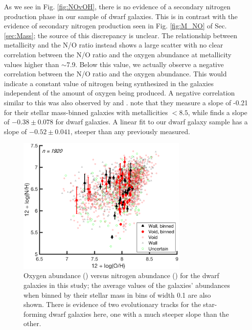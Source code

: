 As we see in Fig. \ref{fig:NOvOH}, there is no evidence of a secondary nitrogen 
production phase in our sample of dwarf galaxies.  This is in contrast with the 
evidence of secondary nitrogen production seen in Fig. \ref{fig:M_NO} of Sec. 
\ref{sec:Mass}; the source of this discrepancy is unclear.  The relationship 
between metallicity and the N/O ratio instead shows a large scatter with no 
clear correlation between the N/O ratio and the oxygen abundance at metallicity 
values higher than $\sim$7.9.  Below this value, we actually observe a negative 
correlation between the N/O ratio and the oxygen abundance.  This would indicate 
a constant value of nitrogen being synthesized in the galaxies independent of 
the amount of oxygen being produced.  A negative correlation similar to this was 
also observed by \cite{Andrews13} and \cite{Douglass17b}.   \cite{Andrews13} 
note that they measure a slope of -0.21 for their stellar mass-binned galaxies 
with metallicities \OH $< 8.5$, while \cite{Douglass17b} finds a slope of 
$-0.38\pm 0.078$ for dwarf galaxies.  A linear fit to our dwarf galaxy sample 
has a slope of $-0.52\pm 0.041$, steeper than any previously measured.

\begin{figure}
    \includegraphics[width=0.75\textwidth]{Images/Paper3/1sig_I06relations_dwarf_SF_t3_dust_NSA_Z12logOH_N12logNH_scatterMbin}
    \caption[O/H versus N/H for star-forming dwarf galaxies]{Oxygen abundance 
    (\OH) versus nitrogen abundance (\NH) for the dwarf galaxies in this study; 
    the average values of the galaxies' abundances when binned by their stellar 
    mass in bins of width 0.1 are also shown.  There is evidence of two 
    evolutionary tracks for the star-forming dwarf galaxies here, one with a 
    much steeper slope than the other.}
    \label{fig:OvN_P3}
\end{figure}


